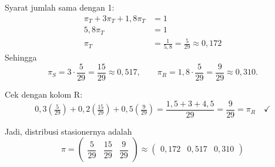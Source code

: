 \documentclass[12pt,a4paper]{article}
\begin{document}
Syarat jumlah sama dengan 1:
\begin{align*}
\pi_T + 3\pi_T + 1,8\pi_T &= 1 \\
5,8\pi_T &= 1 \\
\pi_T &= \frac{1}{5,8} = \frac{5}{29} \approx 0,172
\end{align*}
Sehingga
\[
\pi_S = 3 \cdot \frac{5}{29} = \frac{15}{29} \approx 0,517,
\qquad
\pi_R = 1,8 \cdot \frac{5}{29} = \frac{9}{29} \approx 0,310.
\]

Cek dengan kolom R:
\[
0,3\left(\tfrac{5}{29}\right) + 0,2\left(\tfrac{15}{29}\right) + 0,5\left(\tfrac{9}{29}\right)
= \frac{1,5 + 3 + 4,5}{29} = \frac{9}{29} = \pi_R \quad \checkmark
\]

Jadi, distribusi stasionernya adalah
\[
\boxed{\pi = \begin{pmatrix} \dfrac{5}{29} & \dfrac{15}{29} & \dfrac{9}{29} \end{pmatrix}
\approx \begin{pmatrix} 0,172 & 0,517 & 0,310 \end{pmatrix}}
\]
\end{document}
